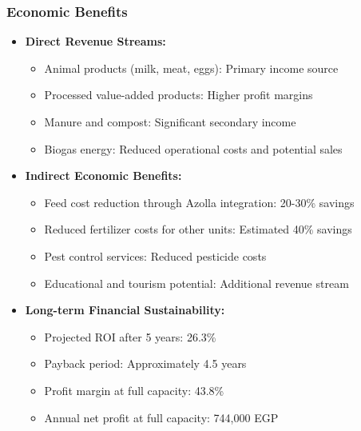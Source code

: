 \subsubsection{Economic Benefits}
\begin{itemize}
    \item \textbf{Direct Revenue Streams:}
    \begin{itemize}
        \item Animal products (milk, meat, eggs): Primary income source
        \item Processed value-added products: Higher profit margins
        \item Manure and compost: Significant secondary income
        \item Biogas energy: Reduced operational costs and potential sales
    \end{itemize}
    
    \item \textbf{Indirect Economic Benefits:}
    \begin{itemize}
        \item Feed cost reduction through Azolla integration: 20-30\% savings
        \item Reduced fertilizer costs for other units: Estimated 40\% savings
        \item Pest control services: Reduced pesticide costs
        \item Educational and tourism potential: Additional revenue stream
    \end{itemize}
    
    \item \textbf{Long-term Financial Sustainability:}
    \begin{itemize}
        \item Projected ROI after 5 years: 26.3\%
        \item Payback period: Approximately 4.5 years
        \item Profit margin at full capacity: 43.8\%
        \item Annual net profit at full capacity: 744,000 EGP
    \end{itemize}
\end{itemize}

